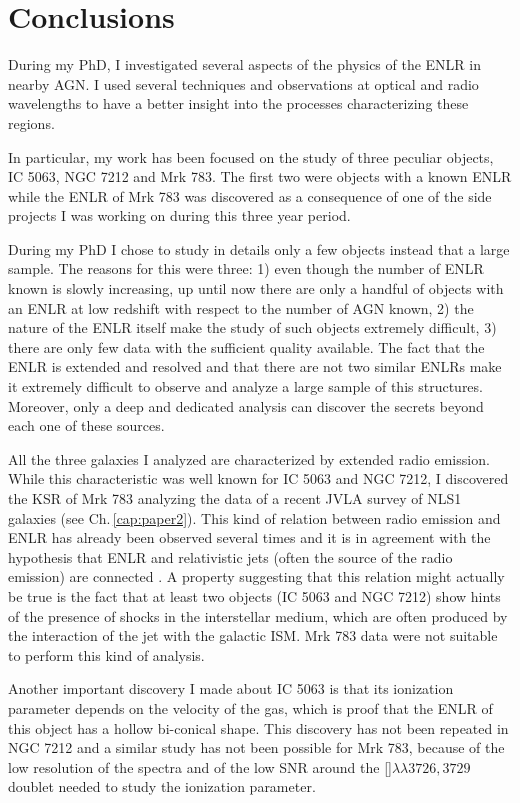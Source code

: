 \documentclass[../main.tex]{subfiles}
\begin{document}
\chapter{Conclusions}
\label{cap:conclusions}


During my PhD, I investigated several aspects of the physics of the ENLR in nearby AGN.
I used several techniques and observations at optical and radio wavelengths to have a better insight into the processes characterizing these regions.

In particular, my work has been focused on the study of three peculiar objects, IC 5063, NGC 7212 and Mrk 783.
The first two were objects with a known ENLR while the ENLR of Mrk 783 was discovered as a consequence of one of the side projects I was working on during this three year period.

During my PhD I chose to study in details only a few objects instead that a large sample.
The reasons for this were three: 1) even though the number of ENLR known is slowly increasing, up until now there are only a handful of objects with an ENLR at low redshift with respect to the number of AGN known, 2) the nature of the ENLR itself make the study of such objects extremely difficult, 3) there are only few data with the sufficient quality available.
The fact that the ENLR is extended and resolved and that there are not two similar ENLRs make it extremely difficult to observe and analyze a large sample of this structures.
Moreover, only a deep and dedicated analysis can discover the secrets beyond each one of these sources.

All the three galaxies I analyzed are characterized by extended radio emission.
While this characteristic was well known for IC 5063 and NGC 7212, I discovered the KSR of Mrk 783 analyzing the data of a recent JVLA survey of NLS1 galaxies (see Ch.\,\ref{cap:paper2}).
This kind of relation between radio emission and ENLR has already been observed several times \citep[e.g.][]{Wilson94,Schmitt03, Schmitt03b} and it is in agreement with the hypothesis that ENLR and relativistic jets (often the source of the radio emission) are connected \citep{Wilson94}.
A property suggesting that this relation might actually be true is the fact that at least two objects (IC 5063 and NGC 7212) show hints of the presence of shocks in the interstellar medium, which are often produced by the interaction of the jet with the galactic ISM.
Mrk 783 data were not suitable to perform this kind of analysis.

Another important discovery I made about IC 5063 is that its ionization parameter depends on the velocity of the gas, which is proof that the ENLR of this object has a hollow bi-conical shape.
This discovery has not been repeated in NGC 7212 and a similar study has not been possible for Mrk 783, because of the low resolution of the spectra and of the low SNR around the []$\lambda\lambda3726,3729$ doublet needed to study the ionization parameter.
\end{document}
